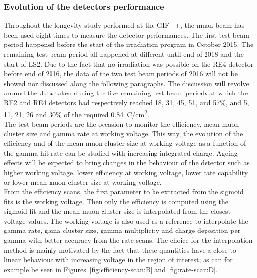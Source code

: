\normalsize
	
	\subsubsection{Evolution of the detectors performance}
	\label{chapt5:sssec:perfevol}
	
	Throughout the longevity study performed at the GIF++, the muon beam has been used eight times to measure the detector performances. The first test beam period happened before the start of the irradiation program in October 2015. The remaining test beam period all happened at different until end of 2018 and the start of LS2. Due to the fact that no irradiation was possible on the RE4 detector before end of 2016, the data of the two test beam periods of 2016 will not be showed nor discussed along the following paragraphs. The discussion will revolve around the data taken during the five remaining test beam periods at which the RE2 and RE4 detectors had respectively reached 18, 31, 45, 51, and 57\%, and 5, 11, 21, 26 and 30\% of the required \SI{0.84}{C/cm^2}.\\
	The test beam periods are the occasion to monitor the efficiency, mean muon cluster size and gamma rate at working voltage. This way, the evolution of the efficiency and of the mean muon cluster size at working voltage as a function of the gamma hit rate can be studied with increasing integrated charge. Ageing effects will be expected to bring changes in the behaviour of the detector such as higher working voltage, lower efficiency at working voltage, lower rate capability or lower mean muon cluster size at working voltage.\\
	From the efficiency scans, the first parameter to be extracted from the sigmoid fits is the working voltage. Then only the efficiency is computed using the sigmoid fit and the mean muon cluster size is interpolated from the closest voltage values. The working voltage is also used as a reference to interpolate the gamma rate, gama cluster size, gamma multiplicity and charge deposition per gamma with better accuracy from the rate scans. The choice for the interpolation method is mainly motivated by the fact that these quantities have a close to linear behaviour with increasing voltage in the region of interest, as can for example be seen in Figures~\ref{fig:efficiency-scan:B} and \ref{fig:rate-scan:D}.
	
